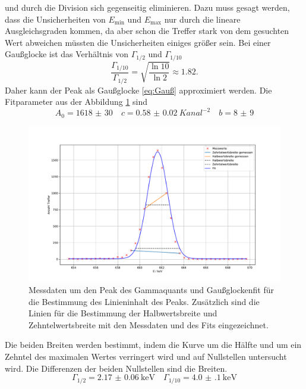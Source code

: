 und durch die Division sich gegenseitig eliminieren. Dazu muss gesagt werden, dass die Unsicherheiten von $E_{\text{min}}$ und
$E_{\text{max}}$ nur durch die lineare Ausgleichsgraden kommen, da aber schon die Treffer stark von dem gesuchten Wert abweichen müssten die 
Unsicherheiten einiges größer sein.
Bei einer Gaußglocke ist das Verhältnis von $\Gamma_{1/2}$ und $\Gamma_{1/10}$ 
\begin{equation*}
  \frac{\Gamma_{1/10}}{\Gamma_{1/2}}= \sqrt{\frac{\ln{10}}{\ln{2}}} \approx \num{1.82}.
\end{equation*}
Daher kann der Peak als Gaußglocke \eqref{eq:Gauß} approximiert werden. 
Die Fitparameter aus der Abbildung \ref{fig:02_fit} sind 
\begin{equation*}
  A_0 = \num{1618(30)}\quad c = \SI{0.58(2)}{Kanal^{-2}} \quad b = \num{8(9)}
\end{equation*}
\FloatBarrier
\begin{figure}
  \centering
  \caption{Messdaten um den Peak des Gammaquants und Gaußglockenfit für die Bestimmung des Linieninhalt des Peaks. Zusätzlich sind die 
  Linien für die Bestimmung der Halbwertsbreite und Zehntelwertsbreite mit den Messdaten und des Fits eingezeichnet.}
  \label{fig:02_fit}
  \includegraphics[width=\textwidth,keepaspectratio]{figure/02_peak_fit.pdf}
\end{figure}
\FloatBarrier
Die beiden Breiten werden bestimmt, indem die Kurve um die Hälfte und um ein Zehntel des maximalen Wertes verringert wird und auf Nullstellen 
untersucht wird.
Die Differenzen der beiden Nullstellen sind die Breiten.
\begin{equation*}
  \Gamma_{1/2} = \SI{2.17(6)}{\kilo\eV}\quad \Gamma_{1/10} = \SI{4.0(1)}{\kilo\eV}
\end{equation*}
